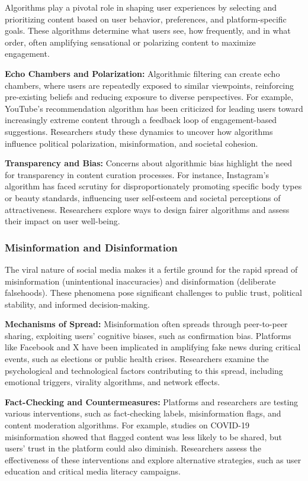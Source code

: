 \documentclass[
]{book}
\begin{document}
Algorithms play a pivotal role in shaping user experiences by selecting and prioritizing content based on user behavior, preferences, and platform-specific goals. These algorithms determine what users see, how frequently, and in what order, often amplifying sensational or polarizing content to maximize engagement.

\textbf{Echo Chambers and Polarization:} Algorithmic filtering can create echo chambers, where users are repeatedly exposed to similar viewpoints, reinforcing pre-existing beliefs and reducing exposure to diverse perspectives. For example, YouTube's recommendation algorithm has been criticized for leading users toward increasingly extreme content through a feedback loop of engagement-based suggestions. Researchers study these dynamics to uncover how algorithms influence political polarization, misinformation, and societal cohesion.

\textbf{Transparency and Bias:} Concerns about algorithmic bias highlight the need for transparency in content curation processes. For instance, Instagram's algorithm has faced scrutiny for disproportionately promoting specific body types or beauty standards, influencing user self-esteem and societal perceptions of attractiveness. Researchers explore ways to design fairer algorithms and assess their impact on user well-being.

\subsubsection*{Misinformation and Disinformation}\label{misinformation-and-disinformation}

The viral nature of social media makes it a fertile ground for the rapid spread of misinformation (unintentional inaccuracies) and disinformation (deliberate falsehoods). These phenomena pose significant challenges to public trust, political stability, and informed decision-making.

\textbf{Mechanisms of Spread:} Misinformation often spreads through peer-to-peer sharing, exploiting users' cognitive biases, such as confirmation bias. Platforms like Facebook and X have been implicated in amplifying fake news during critical events, such as elections or public health crises. Researchers examine the psychological and technological factors contributing to this spread, including emotional triggers, virality algorithms, and network effects.

\textbf{Fact-Checking and Countermeasures:} Platforms and researchers are testing various interventions, such as fact-checking labels, misinformation flags, and content moderation algorithms. For example, studies on COVID-19 misinformation showed that flagged content was less likely to be shared, but users' trust in the platform could also diminish. Researchers assess the effectiveness of these interventions and explore alternative strategies, such as user education and critical media literacy campaigns.
\end{document}

